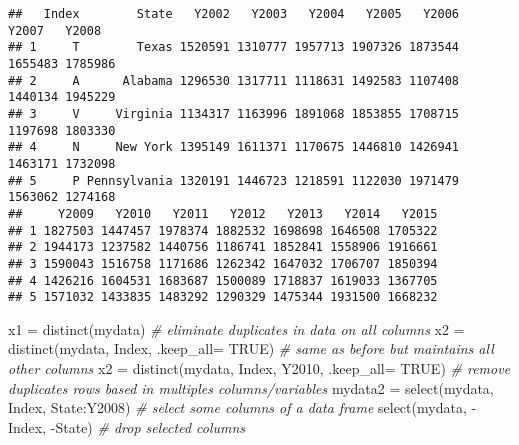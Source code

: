 \documentclass[
]{article}
\newenvironment{Shaded}{\begin{snugshade}}{\end{snugshade}}
\newcommand{\AttributeTok}[1]{\textcolor[rgb]{0.77,0.63,0.00}{#1}}
\newcommand{\CommentTok}[1]{\textcolor[rgb]{0.56,0.35,0.01}{\textit{#1}}}
\newcommand{\ConstantTok}[1]{\textcolor[rgb]{0.00,0.00,0.00}{#1}}
\newcommand{\FunctionTok}[1]{\textcolor[rgb]{0.00,0.00,0.00}{#1}}
\newcommand{\NormalTok}[1]{#1}
\newcommand{\OtherTok}[1]{\textcolor[rgb]{0.56,0.35,0.01}{#1}}
\newcommand{\SpecialCharTok}[1]{\textcolor[rgb]{0.00,0.00,0.00}{#1}}
\begin{document}
\begin{verbatim}
##   Index        State   Y2002   Y2003   Y2004   Y2005   Y2006   Y2007   Y2008
## 1     T        Texas 1520591 1310777 1957713 1907326 1873544 1655483 1785986
## 2     A      Alabama 1296530 1317711 1118631 1492583 1107408 1440134 1945229
## 3     V     Virginia 1134317 1163996 1891068 1853855 1708715 1197698 1803330
## 4     N     New York 1395149 1611371 1170675 1446810 1426941 1463171 1732098
## 5     P Pennsylvania 1320191 1446723 1218591 1122030 1971479 1563062 1274168
##     Y2009   Y2010   Y2011   Y2012   Y2013   Y2014   Y2015
## 1 1827503 1447457 1978374 1882532 1698698 1646508 1705322
## 2 1944173 1237582 1440756 1186741 1852841 1558906 1916661
## 3 1590043 1516758 1171686 1262342 1647032 1706707 1850394
## 4 1426216 1604531 1683687 1500089 1718837 1619033 1367705
## 5 1571032 1433835 1483292 1290329 1475344 1931500 1668232
\end{verbatim}

\begin{Shaded}
\begin{Highlighting}[]
\NormalTok{x1 }\OtherTok{=} \FunctionTok{distinct}\NormalTok{(mydata) }\CommentTok{\# eliminate duplicates in data on all columns}
\NormalTok{x2 }\OtherTok{=} \FunctionTok{distinct}\NormalTok{(mydata, Index, }\AttributeTok{.keep\_all=} \ConstantTok{TRUE}\NormalTok{) }\CommentTok{\# same as before but maintains all other columns}
\NormalTok{x2 }\OtherTok{=} \FunctionTok{distinct}\NormalTok{(mydata, Index, Y2010, }\AttributeTok{.keep\_all=} \ConstantTok{TRUE}\NormalTok{) }\CommentTok{\# remove duplicates rows based in multiples columns/variables}
\NormalTok{mydata2 }\OtherTok{=} \FunctionTok{select}\NormalTok{(mydata, Index, State}\SpecialCharTok{:}\NormalTok{Y2008) }\CommentTok{\# select some columns of a data frame}
\FunctionTok{select}\NormalTok{(mydata, }\SpecialCharTok{{-}}\NormalTok{Index, }\SpecialCharTok{{-}}\NormalTok{State) }\CommentTok{\# drop selected columns}
\end{Highlighting}
\end{Shaded}
\end{document}
